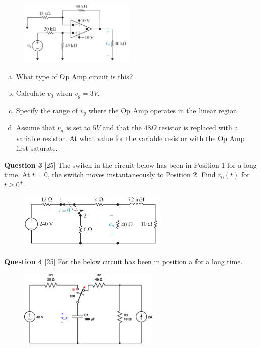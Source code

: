 \documentclass[12pt]{article}
\begin{document}
\begin{figure}[h!]
\centering 
\includegraphics[clip,width=0.49\textwidth]{p05_20.jpg}
\end{figure}

\begin{enumerate}[(a)]
\item What type of Op Amp circuit is this?
\item Calculate $v_0$ when $v_g = 3V$.
\item Specify the range of $v_g$ where the Op Amp operates in the linear region
\item Assume that $v_g$ is set to $5V$ and that the $48 \Omega$ resistor is replaced with a variable resistor. At what value for the variable resistor with the Op Amp first saturate. 
\end{enumerate}

\newpage
{\bf Question 3} [25] 
\newline
The switch in the circuit below has been in Position 1 for a long time. At $t = 0$, the switch moves instantaneously to Position 2. Find $v_0 (t)$ for $t \geq 0^+$.

\begin{figure}[h!]
  \centering 
 \vspace{-0.1in}
 \includegraphics[clip,width=0.64\textwidth]{p07_05.jpg}
\vspace{-0.1in}
\end{figure}


\newpage
{\bf Question 4} [25] 
\newline
For the below circuit has been in position a for a long time. 

\begin{figure}[h!]
     \centering
       \includegraphics[clip,width=0.6\textwidth]{mid2_3.png}
\end{figure}
\end{document}
